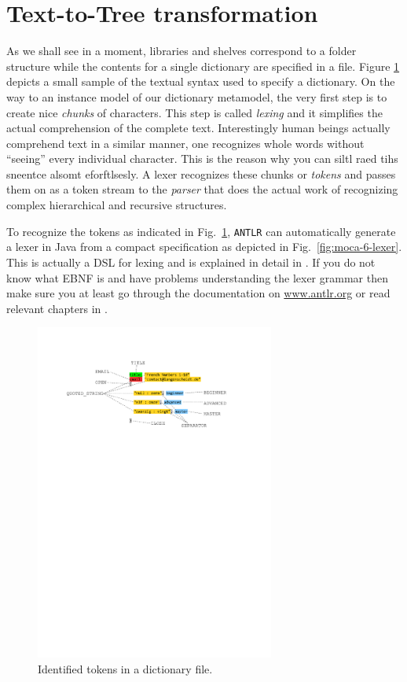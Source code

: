 \section{Text-to-Tree transformation}

As we shall see in a moment, libraries and shelves correspond to a folder structure while the contents for a single dictionary are specified in a file.
Figure \ref{fig:moca-4-Tokens} depicts a small sample of the textual syntax used to specify a dictionary.
On the way to an instance model of our dictionary metamodel, the very first step is to create nice \emph{chunks} of characters.
This step is called \emph{lexing} and it simplifies the actual comprehension of the complete text.
Interestingly human beings actually comprehend text in a similar manner, one recognizes whole words without ``seeing'' every individual character.
This is the reason why you can siltl raed tihs sneentce alsomt eforftlsesly.   
A lexer recognizes these chunks or \emph{tokens} and passes them on as a token stream to the \emph{parser} that does the actual work of recognizing complex hierarchical and recursive structures.   
   
To recognize the tokens as indicated in Fig.~\ref{fig:moca-4-Tokens}, \texttt{ANTLR} can automatically generate a lexer in Java from a compact specification as depicted in Fig.~\ref{fig:moca-6-lexer}.
This is actually a DSL for lexing and is explained in detail in \cite{ANTLR}.
If you do not know what EBNF is and have problems understanding the lexer grammar then make sure you at least go through the documentation on \url{www.antlr.org} or read relevant chapters in \cite{ANTLR}.

\begin{figure}[!htbp]
\begin{center}
 \includegraphics[width=0.7\textwidth]{pics/moca/2TextToMocaTree/4-tokens}
  \caption{Identified tokens in a dictionary file.}
  \label{fig:moca-4-Tokens}
\end{center}
\end{figure}

